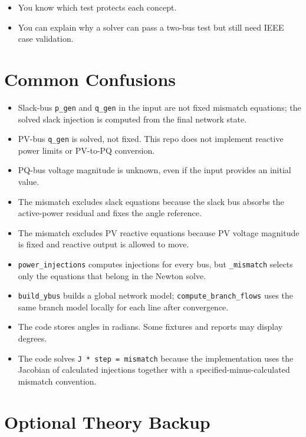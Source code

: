 \documentclass[11pt]{article}
\newcommand{\code}[1]{\texttt{#1}}
\begin{document}
\begin{itemize}
  \item You know which test protects each concept.
  \item You can explain why a solver can pass a two-bus test but still need IEEE
  case validation.
\end{itemize}

\section{Common Confusions}

\begin{itemize}
  \item Slack-bus \code{p\_gen} and \code{q\_gen} in the input are not fixed
  mismatch equations; the solved slack injection is computed from the final
  network state.
  \item PV-bus \code{q\_gen} is solved, not fixed. This repo does not implement
  reactive power limits or PV-to-PQ conversion.
  \item PQ-bus voltage magnitude is unknown, even if the input provides an
  initial value.
  \item The mismatch excludes slack equations because the slack bus absorbs the
  active-power residual and fixes the angle reference.
  \item The mismatch excludes PV reactive equations because PV voltage magnitude
  is fixed and reactive output is allowed to move.
  \item \code{power\_injections} computes injections for every bus, but
  \code{\_mismatch} selects only the equations that belong in the Newton solve.
  \item \code{build\_ybus} builds a global network model;
  \code{compute\_branch\_flows} uses the same branch model locally for each line
  after convergence.
  \item The code stores angles in radians. Some fixtures and reports may display
  degrees.
  \item The code solves \code{J * step = mismatch} because the implementation
  uses the Jacobian of calculated injections together with a
  specified-minus-calculated mismatch convention.
\end{itemize}

\section{Optional Theory Backup}
\end{document}
